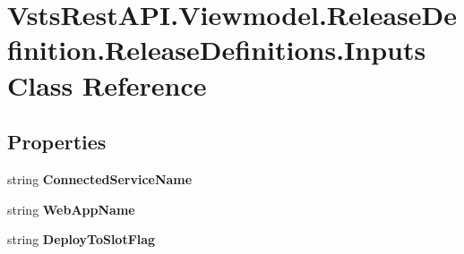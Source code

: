 \hypertarget{class_vsts_rest_a_p_i_1_1_viewmodel_1_1_release_definition_1_1_release_definitions_1_1_inputs}{}\section{Vsts\+Rest\+A\+P\+I.\+Viewmodel.\+Release\+Definition.\+Release\+Definitions.\+Inputs Class Reference}
\label{class_vsts_rest_a_p_i_1_1_viewmodel_1_1_release_definition_1_1_release_definitions_1_1_inputs}
\subsection*{Properties}
\begin{DoxyCompactItemize}
\item 
\mbox{\label{class_vsts_rest_a_p_i_1_1_viewmodel_1_1_release_definition_1_1_release_definitions_1_1_inputs_add5e6c793e74115c070647cf5dfa18a5}} 
string {\bfseries Connected\+Service\+Name}
\item 
\mbox{\label{class_vsts_rest_a_p_i_1_1_viewmodel_1_1_release_definition_1_1_release_definitions_1_1_inputs_aff3b929b95fffa3eb5e084edd401d0c3}} 
string {\bfseries Web\+App\+Name}
\item 
\mbox{\label{class_vsts_rest_a_p_i_1_1_viewmodel_1_1_release_definition_1_1_release_definitions_1_1_inputs_abed34a5092f9ca3c8379ad6a18b94e90}} 
string {\bfseries Deploy\+To\+Slot\+Flag}
\item 
\mbox{\label{class_vsts_rest_a_p_i_1_1_viewmodel_1_1_release_definition_1_1_release_definitions_1_1_inputs_a1676b5b52947be81d66b7ac3a0d72eb7}} 

\end{DoxyCompactItemize}
